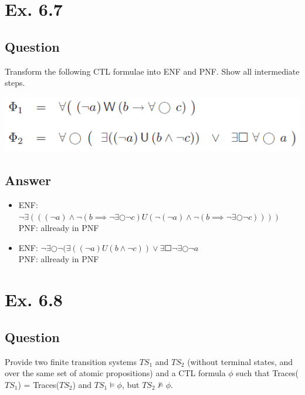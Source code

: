\documentclass[12pt]{article}
\begin{document}
\newpage
\section*{Ex. 6.7}
\subsection*{Question}
Transform the following CTL formulae into ENF and PNF. Show all intermediate
steps.
\begin{center}
	\includegraphics*[scale=0.8]{ex67.png}
\end{center}

\subsection*{Answer}
\begin{itemize}
	\item ENF: $\neg\exists(((\neg a)\wedge\neg(b\implies\neg\exists\Circle\neg c)U(\neg(\neg a)\wedge\neg(b\implies\neg\exists\Circle\neg c))))$\\
		PNF: allready in PNF
	\item ENF: $\neg\exists\Circle\neg(\exists((\neg a)U(b\wedge\neg c))\vee\exists\Square\neg\exists\Circle\neg a$\\
		PNF: allready in PNF
\end{itemize}

\newpage
\section*{Ex. 6.8}
\subsection*{Question}
Provide two finite transition systems $TS_1$ and $TS_2$ (without terminal states, and over the same set of atomic propositions) and a CTL formula $\phi$ such that Traces($TS_1$) = Traces($TS_2$) and $TS_1 \models\phi$, but $TS_2 \not\models\phi$.
\end{document}
